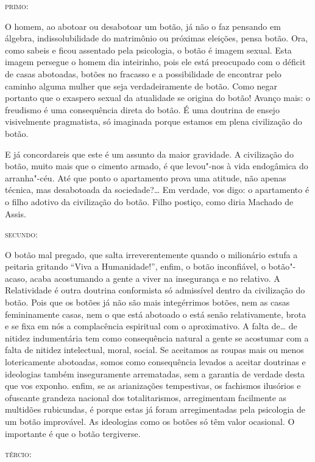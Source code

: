 \textsc{primo}:

O homem, ao abotoar ou desabotoar um botão, já não o faz pensando em
álgebra, indissolubilidade do matrimônio ou próximas eleições, pensa
botão. Ora, como sabeis e ficou assentado pela psicologia, o botão é
imagem sexual. Esta imagem persegue o homem dia inteirinho, pois ele
está preocupado com o déficit de casas abotoadas, botões no fracasso e a
possibilidade de encontrar pelo caminho alguma mulher que seja
verdadeiramente de botão. Como negar portanto que o exaspero sexual da
atualidade se origina do botão! Avanço mais: o freudismo é uma
consequência direta do botão. É uma doutrina de ensejo visivelmente
pragmatista, só imaginada porque estamos em plena civilização do botão.

E já concordareis que este é um assunto da maior gravidade. A
civilização do botão, muito mais que o cimento armado, é que levou"-nos à
vida endogâmica do arranha"-céu. Até que ponto o apartamento prova uma
atitude, não apenas técnica, mas desabotoada da sociedade?\ldots{} Em
verdade, vos digo: o apartamento é o filho adotivo da civilização do
botão. Filho postiço, como diria Machado de Assis.

\textsc{secundo}:

O botão mal pregado, que salta irreverentemente quando o milionário
estufa a peitaria gritando ``Viva a Humanidade!'', enfim, o botão
inconfiável, o botão"-acaso, acaba acostumando a gente a viver na
insegurança e no relativo. A Relatividade é outra doutrina conformista
só admissível dentro da civilização do botão. Pois que os botões já não
são mais integérrimos botões, nem as casas femininamente casas, nem o
que está abotoado o está senão relativamente, brota e se fixa em nós a
complacência espiritual com o aproximativo. A falta de\ldots{} de nitidez
indumentária tem como consequência natural a gente se acostumar com a
falta de nitidez intelectual, moral, social. Se aceitamos as roupas mais
ou menos lotericamente abotoadas, somos como consequência levados a
aceitar doutrinas e ideologias também inseguramente arrematadas, sem a
garantia de verdade desta que vos exponho. enfim, se as arianizações
tempestivas, os fachismos ilusórios e ofuscante grandeza nacional dos
totalitarismos, arregimentam facilmente as multidões rubicundas, é
porque estas já foram arregimentadas pela psicologia de um botão
improvável. As ideologias como os botões só têm valor ocasional. O
importante é que o botão tergiverse.

\textsc{tércio}:

